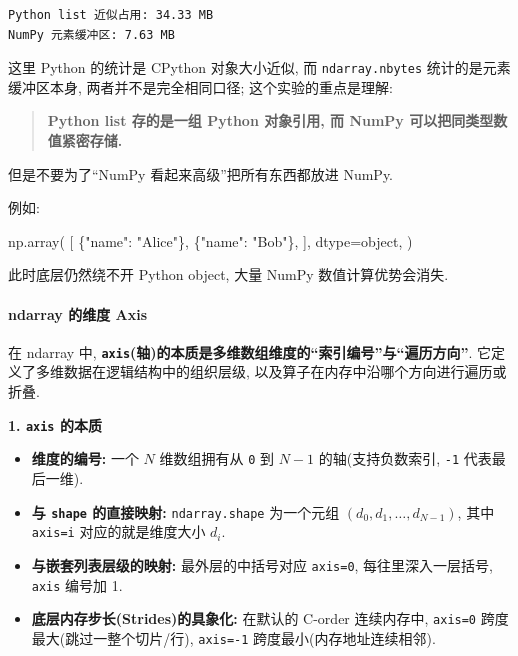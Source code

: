 \documentclass[11pt]{article}
\providecommand{\tightlist}{%
      \setlength{\itemsep}{0pt}\setlength{\parskip}{0pt}}
\newenvironment{Shaded}{}{}
\newcommand{\StringTok}[1]{\textcolor[rgb]{0.25,0.44,0.63}{{#1}}}
\newcommand{\NormalTok}[1]{{#1}}
\newcommand{\OperatorTok}[1]{\textcolor[rgb]{0.40,0.40,0.40}{{#1}}}
\newcommand{\BuiltInTok}[1]{{#1}}
\begin{document}
    \begin{Verbatim}[commandchars=\\\{\}]
Python list 近似占用: 34.33 MB
NumPy 元素缓冲区: 7.63 MB
    \end{Verbatim}

    这里 Python 的统计是 CPython 对象大小近似, 而 \texttt{ndarray.nbytes}
统计的是元素缓冲区本身, 两者并不是完全相同口径; 这个实验的重点是理解:

\begin{quote}
\textbf{Python list 存的是一组 Python 对象引用, 而 NumPy
可以把同类型数值紧密存储.}
\end{quote}

但是不要为了``NumPy 看起来高级''把所有东西都放进 NumPy.

例如:

\begin{Shaded}
\begin{Highlighting}[]
\NormalTok{np.array(}
\NormalTok{    [}
\NormalTok{        \{}\StringTok{"name"}\NormalTok{: }\StringTok{"Alice"}\NormalTok{\},}
\NormalTok{        \{}\StringTok{"name"}\NormalTok{: }\StringTok{"Bob"}\NormalTok{\},}
\NormalTok{    ],}
\NormalTok{    dtype}\OperatorTok{=}\BuiltInTok{object}\NormalTok{,}
\NormalTok{)}
\end{Highlighting}
\end{Shaded}

此时底层仍然绕不开 Python object, 大量 NumPy 数值计算优势会消失.

    \paragraph{ndarray 的维度 Axis}\label{ndarray-ux7684ux7ef4ux5ea6-axis}

    在 ndarray 中,
\textbf{\texttt{axis}(轴)的本质是多维数组维度的``索引编号''与``遍历方向''}.
它定义了多维数据在逻辑结构中的组织层级,
以及算子在内存中沿哪个方向进行遍历或折叠.

\textbf{1. \texttt{axis} 的本质}

\begin{itemize}
\tightlist
\item
  \textbf{维度的编号:} 一个 \(N\) 维数组拥有从 \texttt{0} 到 \(N-1\)
  的轴(支持负数索引, \texttt{-1} 代表最后一维).
\item
  \textbf{与 \texttt{shape} 的直接映射:} \texttt{ndarray.shape}
  为一个元组 \((d_0, d_1, \dots, d_{N-1})\), 其中 \texttt{axis=i}
  对应的就是维度大小 \(d_i\).
\item
  \textbf{与嵌套列表层级的映射:} 最外层的中括号对应 \texttt{axis=0},
  每往里深入一层括号, \texttt{axis} 编号加 1.
\item
  \textbf{底层内存步长(Strides)的具象化:} 在默认的 C-order 连续内存中,
  \texttt{axis=0} 跨度最大(跳过一整个切片/行), \texttt{axis=-1}
  跨度最小(内存地址连续相邻).
\end{itemize}
\end{document}
